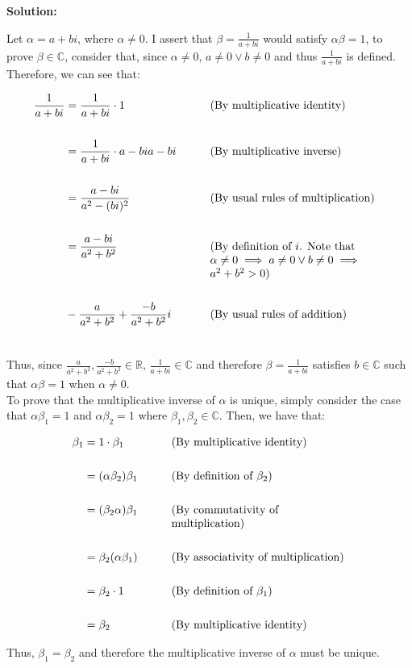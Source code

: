 \documentclass[10pt]{article}
\newcommand{\comment}[1]{\parbox[t]{0.45\textwidth}{\raggedright #1}}
\newenvironment{solution}{
	\vspace{1em}\par\large\textbf{{Solution:}}\par\vspace{1em}
}{
	\vspace{1em}
	\newpage
}
\begin{document}
\begin{solution}
	Let $\alpha = a + bi$, where $\alpha \neq 0$. I assert that $\beta = \frac{1}{a + bi}$ would satisfy $\alpha\beta = 1$, to prove $\beta \in \mathbb{C}$, consider that, since $\alpha \neq 0$, $a \neq 0 \vee b \neq 0$ and thus $\frac{1}{a + bi}$ is defined. Therefore, we can see that:

	\begin{align*}
		\frac{1}{a + bi} &= \frac{1}{a + bi} \cdot 1 \qquad && \comment{(By multiplicative identity)} \\\\
		&= \frac{1}{a + bi} \cdot {a - bi}{a - bi} \qquad && \comment{(By multiplicative inverse)} \\\\
		&= \frac{a - bi}{a^2 - (bi)^2} \qquad && \comment{(By usual rules of multiplication)} \\\\
		&= \frac{a - bi}{a^2 + b^2} \qquad && \comment{(By definition of $i$. Note that $\alpha \neq 0 \implies a \neq 0 \vee b \neq 0 \implies a^2 + b^2 > 0$)} \\\\
		&- \frac{a}{a^2 + b^2} + \frac{-b}{a^2 + b^2}i \qquad && \comment{(By usual rules of addition)} \\\\
	\end{align*}

	Thus, since $\frac{a}{a^2 + b^2}, \frac{-b}{a^2 + b^2} \in \mathbb{R}$, $\frac{1}{a + bi} \in \mathbb{C}$ and therefore $\beta = \frac{1}{a + bi}$ satisfies $b \in \mathbb{C}$ such that $\alpha\beta = 1$ when $\alpha \neq 0$. \\

	To prove that the multiplicative inverse of $\alpha$ is unique, simply consider the case that $\alpha\beta_1 = 1$ and $\alpha\beta_2 = 1$ where $\beta_1, \beta_2 \in \mathbb{C}$. Then, we have that:

	\begin{align*}
		\beta_1 &= 1 \cdot \beta_1 \qquad && \comment{(By multiplicative identity)} \\\\
		&= (\alpha\beta_2)\beta_1 \qquad && \comment{(By definition of $\beta_2$)} \\\\
		&= (\beta_2\alpha)\beta_1 \qquad && \comment{(By commutativity of multiplication)} \\\\
		&= \beta_2(\alpha\beta_1) \qquad && \comment{(By associativity of multiplication)} \\\\
		&= \beta_2 \cdot 1 \qquad && \comment{(By definition of $\beta_1$)} \\\\
		&= \beta_2 \qquad && \comment{(By multiplicative identity)}
	\end{align*}

	Thus, $\beta_1 = \beta_2$ and therefore the multiplicative inverse of $\alpha$ must be unique.
\end{solution}
\end{document}
